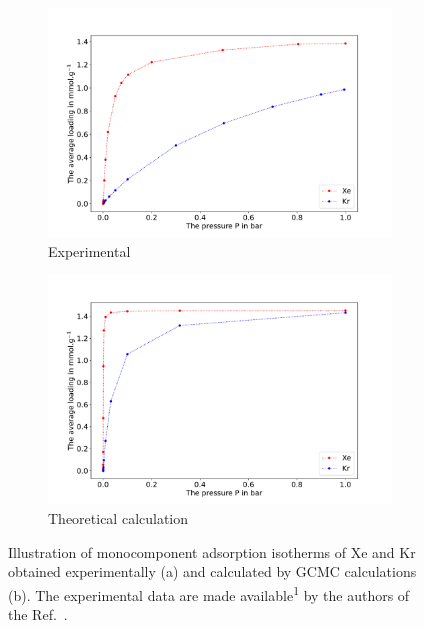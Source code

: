 \documentclass[main.tex]{subfiles}
\begin{document}
\begin{figure}[ht]
  \centering
  \begin{subfigure}[b]{0.45\textwidth}
    \centering
    \includegraphics[height=0.7\textwidth]{figures/1-screening/Isotherm_Banerjee.pdf}
    \caption{Experimental}
  \end{subfigure}
  \hfill
  \begin{subfigure}[b]{0.45\textwidth}
    \centering
    \includegraphics[height=0.7\textwidth]{figures/1-screening/Isotherm_KAXQIL_gcmc_uff.pdf}
    \caption{Theoretical calculation}
  \end{subfigure}
  \caption{Illustration of monocomponent adsorption isotherms of Xe and Kr obtained experimentally (a) and calculated by GCMC calculations (b). The experimental data are made available\textsuperscript{1} by the authors of the Ref.~\cite{Banerjee_2016}. }\label{isotherm}
\end{figure}
\end{document}
